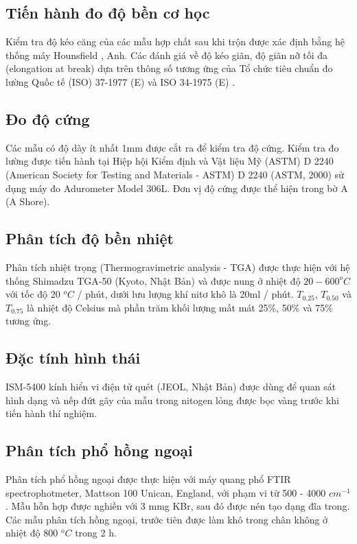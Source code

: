 \documentclass[12pt,a4paper]{article}
\begin{document}
		\subsection{Tiến hành đo độ bền cơ học}%
		Kiểm tra độ kéo căng của các mẫu hợp chất sau khi trộn được xác định bằng hệ thống máy Hounsfield , Anh. Các đánh giá về độ kéo giãn, độ giãn nỡ tối đa (elongation at break) dựa trên thông số tương ứng của Tổ chức tiêu chuẩn đo lường Quốc tế (ISO) 37-1977 (E) và ISO 34-1975 (E) .
		\subsection{Đo độ cứng}%
		Các mẫu có độ dày ít nhất 1mm được cắt ra để kiểm tra độ cứng. Kiểm tra đo lường được tiến hành tại Hiệp hội Kiểm định và Vật liệu Mỹ (ASTM) D 2240 (American Society for Testing and Materials - ASTM) D 2240 (ASTM, 2000) sử dụng máy đo Adurometer Model 306L. Đơn vị độ cứng được thể hiện trong bờ A (A Shore).
		\subsection{Phân tích độ bền nhiệt}%
		Phân tích nhiệt trọng (Thermogravimetric analysis - TGA) được thực hiện với hệ thống Shimadzu TGA-50 (Kyoto, Nhật Bản) và được nung ở nhiệt độ $20-600 ^oC$ với tốc độ 20 $^oC$ / phút, dưới lưu lượng khí nitơ khô là 20ml / phút. $T_{0.25}$, $T_{0.50}$ và $T_{0.75}$ là nhiệt độ Celsius mà phần trăm khối lượng mất mát 25\%, 50\% và 75\% tương ứng.
		\subsection{Đặc tính hình thái}%
		ISM-5400 kính hiển vi điện tử quét (JEOL, Nhật Bản) được dùng để quan sát hình dạng và nếp đứt gãy của mẫu trong nitogen lỏng được bọc vàng trước khi tiến hành thí nghiệm.
		\subsection{Phân tích phổ hồng ngoại}%
		Phân tích phổ hồng ngoại được thực hiện với máy quang phổ FTIR spectrophotmeter, Mattson 100 Unican, England, với phạm vi từ 500 -  4000  $cm^{-1}$. Mẫu hỗn hợp được nghiền với 3 mmg KBr, sau đó được nén tạo dạng đĩa trong. Các mẫu phân tích hồng ngoại, trước tiên được làm khô trong chân không ở nhiệt độ 800 $^oC$ trong 2 h.
\end{document}
